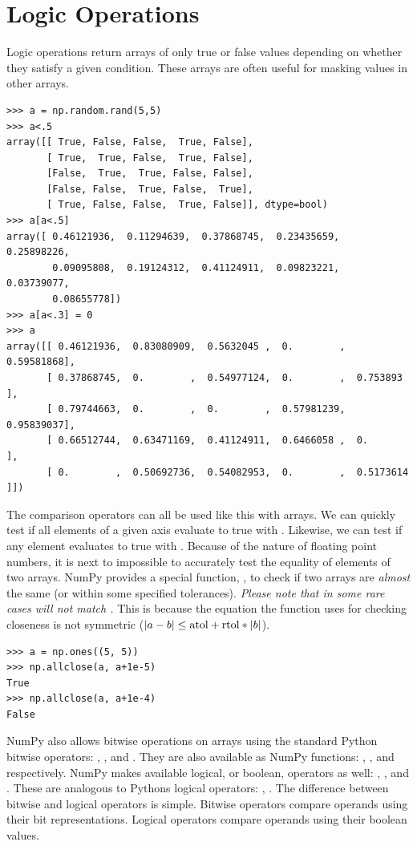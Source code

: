 \label{lab:NumPySciPy}

\section*{Logic Operations}
Logic operations return arrays of only true or false values depending on whether they satisfy a given condition.
These arrays are often useful for masking values in other arrays.
\begin{lstlisting}
>>> a = np.random.rand(5,5)
>>> a<.5
array([[ True, False, False,  True, False],
       [ True,  True, False,  True, False],
       [False,  True,  True, False, False],
       [False, False,  True, False,  True],
       [ True, False, False,  True, False]], dtype=bool)
>>> a[a<.5]
array([ 0.46121936,  0.11294639,  0.37868745,  0.23435659,  0.25898226,
        0.09095808,  0.19124312,  0.41124911,  0.09823221,  0.03739077,
        0.08655778])
>>> a[a<.3] = 0
>>> a
array([[ 0.46121936,  0.83080909,  0.5632045 ,  0.        ,  0.59581868],
       [ 0.37868745,  0.        ,  0.54977124,  0.        ,  0.753893  ],
       [ 0.79744663,  0.        ,  0.        ,  0.57981239,  0.95839037],
       [ 0.66512744,  0.63471169,  0.41124911,  0.6466058 ,  0.        ],
       [ 0.        ,  0.50692736,  0.54082953,  0.        ,  0.5173614 ]])
\end{lstlisting}
The comparison operators can all be used like this with arrays.
We can quickly test if all elements of a given axis evaluate to true with .  Likewise, we can test if any element evaluates to true with .
Because of the nature of floating point numbers, it is next to impossible to accurately test the equality of elements of two arrays.
NumPy provides a special function, , to check if two arrays are \emph{almost} the same (or within some specified tolerances).
\emph{Please note that in some rare cases  will not match .}  This is because the equation the function uses for checking closeness is not symmetric ($\left\lvert a-b\right\rvert \leq \mbox{atol} + \mbox{rtol}*\left\lvert b\right\rvert$).
\begin{lstlisting}
>>> a = np.ones((5, 5))
>>> np.allclose(a, a+1e-5)
True
>>> np.allclose(a, a+1e-4)
False
\end{lstlisting}
NumPy also allows bitwise operations on arrays using the standard Python bitwise operators: \li{&}, \li{|}, and \li{^}.
They are also available as NumPy functions: , , and  respectively.
NumPy makes available logical, or boolean, operators as well: , , and .
These are analogous to Pythons logical operators: , .
The difference between bitwise and logical operators is simple.
Bitwise operators compare operands using their bit representations.
Logical operators compare operands using their boolean values.

